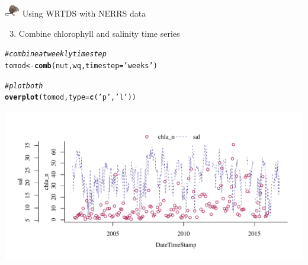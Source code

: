 \documentclass[xcolor=dvipsnames,serif]{beamer}\usepackage[]{graphicx}\usepackage[]{color}
\makeatletter
\newcommand{\hlstr}[1]{\textcolor[rgb]{0.192,0.494,0.8}{#1}}%
\newcommand{\hlcom}[1]{\textcolor[rgb]{0.678,0.584,0.686}{\textit{#1}}}%
\newcommand{\hlstd}[1]{\textcolor[rgb]{0.345,0.345,0.345}{#1}}%
\newcommand{\hlkwb}[1]{\textcolor[rgb]{0.69,0.353,0.396}{#1}}%
\newcommand{\hlkwc}[1]{\textcolor[rgb]{0.333,0.667,0.333}{#1}}%
\newcommand{\hlkwd}[1]{\textcolor[rgb]{0.737,0.353,0.396}{\textbf{#1}}}%
\newenvironment{kframe}{%
 \def\at@end@of@kframe{}%
 \ifinner\ifhmode%
  \def\at@end@of@kframe{\end{minipage}}%
  \begin{minipage}{\columnwidth}%
 \fi\fi%
 \def\FrameCommand##1{\hskip\@totalleftmargin \hskip-\fboxsep
 \colorbox{shadecolor}{##1}\hskip-\fboxsep
     \hskip-\linewidth \hskip-\@totalleftmargin \hskip\columnwidth}%
 \MakeFramed {\advance\hsize-\width
   \@totalleftmargin\z@ \linewidth\hsize
   \@setminipage}}%
 {\par\unskip\endMakeFramed%
 \at@end@of@kframe}
\newenvironment{knitrout}{}{} %
\makeatother
\begin{document}
\begin{frame}[t, fragile]{\includegraphics[width = 0.05\textwidth]{imgs/swmprat.png} Using WRTDS with NERRS data}{}
\begin{enumerate}
\setcounter{enumi}{2}
\item<1-> Combine chlorophyll and salinity time series
\end{enumerate}
\begin{knitrout}\scriptsize
{}\color{fgcolor}\begin{kframe}
\begin{alltt}
\hlcom{# combine at weekly time step}
\hlstd{tomod} \hlkwb{<-} \hlkwd{comb}\hlstd{(nut, wq,} \hlkwc{timestep} \hlstd{=} \hlstr{'weeks'}\hlstd{)}

\hlcom{# plot both}
\hlkwd{overplot}\hlstd{(tomod,} \hlkwc{type} \hlstd{=} \hlkwd{c}\hlstd{(}\hlstr{'p'}\hlstd{,} \hlstr{'l'}\hlstd{))}
\end{alltt}
\end{kframe}
\end{knitrout}
\includegraphics[width = \textwidth, clip=true, trim=0cm 0cm 0cm 1cm]{imgs/chlasal-1.pdf}
\end{frame}
\end{document}
